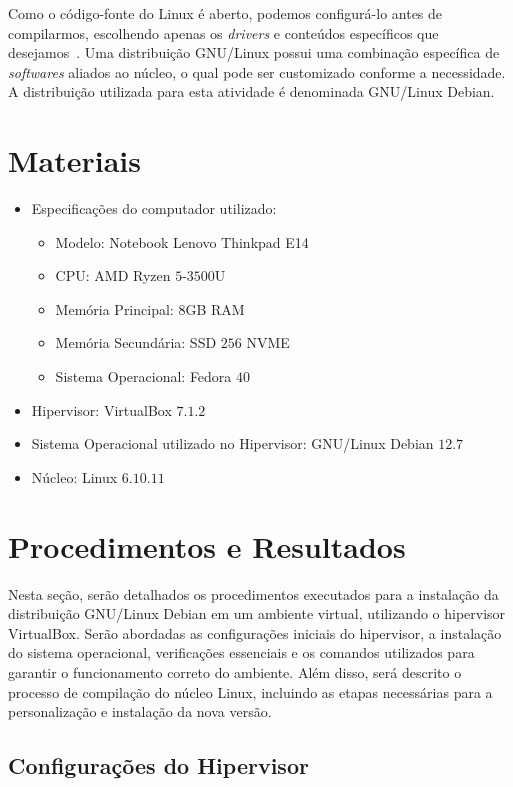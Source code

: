 \documentclass[
	12pt,				%
	oneside,   	        %
	a4paper,			%
	english,			%
	french,				%
	spanish,			%
	brazil,				%
	]{pacotes/abntex2}
\begin{document}
Como o código-fonte do Linux é aberto, podemos configurá-lo antes de compilarmos, escolhendo apenas os \textit{drivers} e conteúdos específicos que desejamos~\cite{robert2010}. Uma distribuição GNU/Linux possui uma combinação específica de \textit{softwares} aliados ao núcleo, o qual pode ser customizado conforme a necessidade. A distribuição utilizada para esta atividade é denominada GNU/Linux Debian.

\section{Materiais}
\label{sec:materiais}

\begin{itemize}
  \item Especificações do computador utilizado:
  \begin{itemize}
    \item Modelo: Notebook Lenovo Thinkpad E14
    \item CPU: AMD Ryzen $5$-$3500$U
    \item Memória Principal: $8$GB RAM
    \item Memória Secundária: SSD $256$ NVME
    \item Sistema Operacional: Fedora $40$
  \end{itemize}
  \item Hipervisor: VirtualBox $7.1.2$
  \item Sistema Operacional utilizado no Hipervisor: GNU/Linux Debian $12.7$
  \item Núcleo: Linux $6.10.11$
\end{itemize}

\section{Procedimentos e Resultados}
\label{sec:procedimentos}

Nesta seção, serão detalhados os procedimentos executados para a instalação da distribuição GNU/Linux Debian em um ambiente virtual, utilizando o hipervisor VirtualBox. Serão abordadas as configurações iniciais do hipervisor, a instalação do sistema operacional, verificações essenciais e os comandos utilizados para garantir o funcionamento correto do ambiente. Além disso, será descrito o processo de compilação do núcleo Linux, incluindo as etapas necessárias para a personalização e instalação da nova versão. 

\subsection{Configurações do Hipervisor}
\label{subsec:hipervisor}
\end{document}
